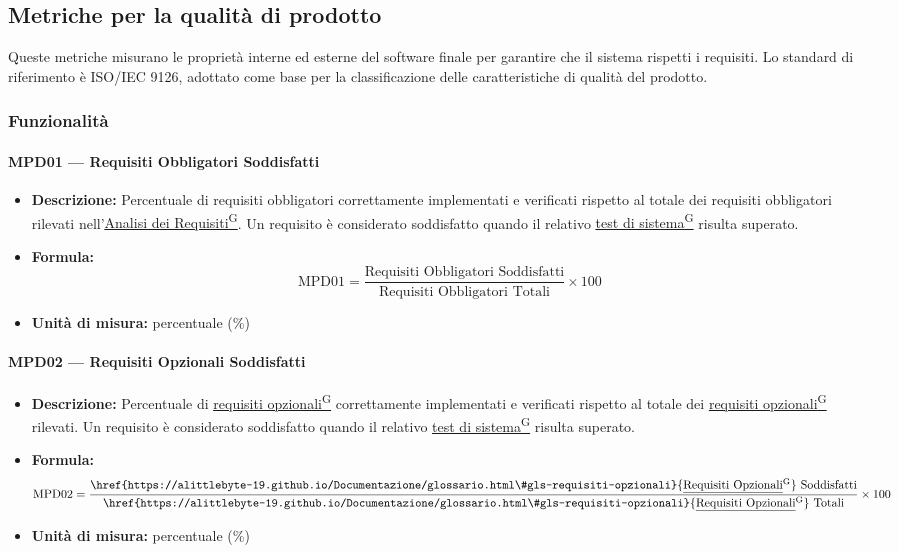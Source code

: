 \documentclass[a4paper,12pt]{article}
\providecommand{\glslink}[2]{\href{https://alittlebyte-19.github.io/Documentazione/glossario.html\#gls-#1}{\underline{#2}\textsuperscript{\scriptsize G}}}
\begin{document}
\subsection{Metriche per la qualità di prodotto}
Queste metriche misurano le proprietà interne ed esterne del software finale per garantire che il sistema rispetti i requisiti. Lo standard di riferimento è ISO/IEC 9126, adottato come base per la classificazione delle caratteristiche di qualità del prodotto.

\subsubsection{Funzionalità}

\paragraph{MPD01 --- Requisiti Obbligatori Soddisfatti}
\begin{itemize}
    \item \textbf{Descrizione:} Percentuale di requisiti obbligatori correttamente implementati e verificati rispetto al totale dei requisiti obbligatori rilevati nell'\glslink{analisi-dei-requisiti-adr}{Analisi dei Requisiti}. Un requisito è considerato soddisfatto quando il relativo \glslink{test-di-sistema}{test di sistema} risulta superato.
    \item \textbf{Formula:}
    $$\text{MPD01} = \frac{\text{Requisiti Obbligatori Soddisfatti}}{\text{Requisiti Obbligatori Totali}} \times 100$$
    \item \textbf{Unità di misura:} percentuale (\%)
\end{itemize}

\paragraph{MPD02 --- Requisiti Opzionali Soddisfatti}
\begin{itemize}
    \item \textbf{Descrizione:} Percentuale di \glslink{requisiti-opzionali}{requisiti opzionali} correttamente implementati e verificati rispetto al totale dei \glslink{requisiti-opzionali}{requisiti opzionali} rilevati. Un requisito è considerato soddisfatto quando il relativo \glslink{test-di-sistema}{test di sistema} risulta superato.
    \item \textbf{Formula:}
    $$\text{MPD02} = \frac{\text{\glslink{requisiti-opzionali}{Requisiti Opzionali} Soddisfatti}}{\text{\glslink{requisiti-opzionali}{Requisiti Opzionali} Totali}} \times 100$$
    \item \textbf{Unità di misura:} percentuale (\%)
\end{itemize}
\end{document}

